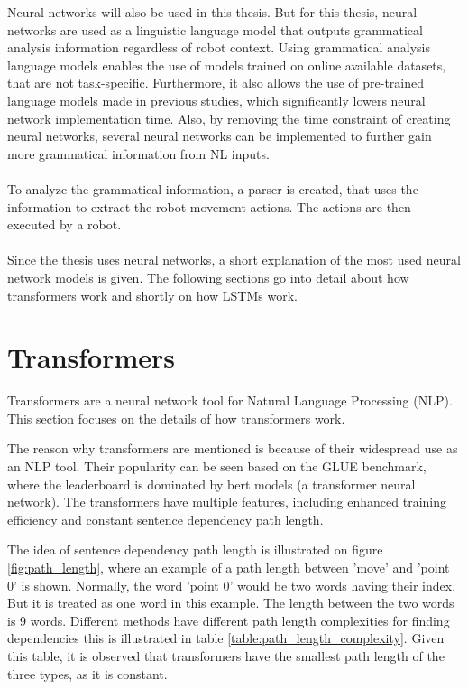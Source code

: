 Neural networks will also be used in this thesis. But for this thesis, neural networks are used as a linguistic language model that outputs grammatical analysis information regardless of robot context. Using grammatical analysis language models enables the use of models trained on online available datasets, that are not task-specific. Furthermore, it also allows the use of pre-trained language models made in previous studies, which significantly lowers neural network implementation time. Also, by removing the time constraint of creating neural networks, several neural networks can be implemented to further gain more grammatical information from NL inputs.
\\\\
To analyze the grammatical information, a parser is created, that uses the information to extract the robot movement actions. The actions are then executed by a robot.
\\\\
Since the thesis uses neural networks, a short explanation of the most used neural network models is given.
The following sections go into detail about how transformers work and shortly on how LSTMs work.


\section{Transformers} \label{sec:TF}

Transformers are a neural network tool for Natural Language Processing (NLP). This section focuses on the details of how transformers work.

The reason why transformers are mentioned is because of their widespread use as an NLP tool. Their popularity can be seen based on the GLUE benchmark\cite{wang2018glue}, where the leaderboard is dominated by bert models (a transformer neural network).
The transformers have multiple features, including enhanced training efficiency and constant sentence dependency path length. 

The idea of sentence dependency path length is illustrated on figure \ref{fig:path_length}, where an example of a path length between 'move' and 'point 0' is shown. Normally, the word 'point 0' would be two words having their index. But it is treated as one word in this example. The length between the two words is 9 words. Different methods have different path length complexities for finding dependencies this is illustrated in table \ref{table:path_length_complexity}. Given this table, it is observed that transformers have the smallest path length of the three types, as it is constant.


